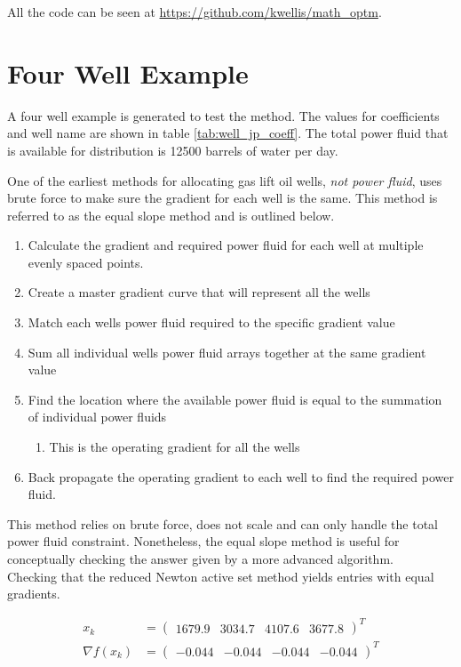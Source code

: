 \documentclass{article}
\begin{document}
All the code can be seen at \url{https://github.com/kwellis/math_optm}.

\section{Four Well Example}

A four well example is generated to test the method. The values for coefficients and well name are shown in table \ref{tab:well_jp_coeff}. The total power fluid that is available for distribution is 12500 barrels of water per day.



One of the earliest methods for allocating gas lift oil wells, \textit{not power fluid}, uses brute force to make sure the gradient for each well is the same. This method is referred to as the equal slope method \cite{gas_lift_econ} and is outlined below.

\begin{enumerate}
    \item Calculate the gradient and required power fluid for each well at multiple evenly spaced points.
    \item Create a master gradient curve that will represent all the wells
    \item Match each wells power fluid required to the specific gradient value
    \item Sum all individual wells power fluid arrays together at the same gradient value
    \item Find the location where the available power fluid is equal to the summation of individual power fluids
    \begin{enumerate}
        \item This is the operating gradient for all the wells
    \end{enumerate}
    \item Back propagate the operating gradient to each well to find the required power fluid.
\end{enumerate}

This method relies on brute force, does not scale and can only handle the total power fluid constraint. Nonetheless, the equal slope method is useful for conceptually checking the answer given by a more advanced algorithm. \\

Checking that the reduced Newton active set method yields entries with equal gradients.

\begin{equation*}
\begin{aligned}
    x_{k} & = 
    \begin{pmatrix}
        1679.9 & 3034.7 & 4107.6 & 3677.8
    \end{pmatrix}^{T} \\
    \nabla f(x_{k}) & =
    \begin{pmatrix}
        -0.044 & -0.044 & -0.044 & -0.044
    \end{pmatrix}^T
\end{aligned}
\end{equation*}
\end{document}
